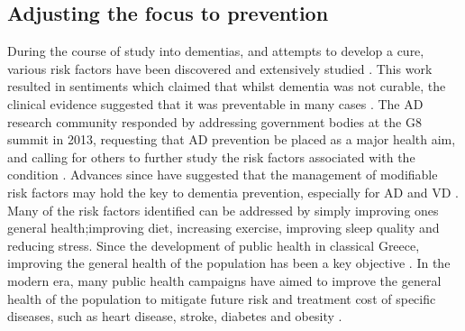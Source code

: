\subsection{Adjusting the focus to prevention}
During the course of study into dementias, and attempts to develop a cure, various risk factors have been discovered and extensively studied \cite{Baumgart2015}. This work resulted in sentiments which claimed that whilst dementia was not curable, the clinical evidence suggested that it was preventable in many cases \cite{DelaTorre2010,Willis2013}. The AD research community responded by addressing government bodies at the G8 summit in 2013, requesting that AD prevention be placed as a major health aim, and calling for others to further study the risk factors associated with the condition \cite{Smith2014}. Advances since have suggested that the management of modifiable risk factors may hold the key to dementia prevention, especially for AD and VD \cite{Solomon2014, Lovden2013}. Many of the risk factors identified can be addressed by simply improving ones general health;improving diet, increasing exercise, improving sleep quality and reducing stress. Since the development of public health in classical Greece, improving the general health of the population has been a key objective \cite{Ozonoff1994}. In the modern era, many public health campaigns have aimed to improve the general health of the population to mitigate future risk and treatment cost of specific diseases, such as heart disease, stroke, diabetes and obesity \cite{Labarthe2014, CentersforDiseaseControlandPrevention2015}.

